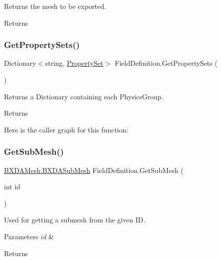 Returns the mesh to be exported. 

\begin{DoxyReturn}{Returns}

\end{DoxyReturn}
\mbox{\label{class_field_definition_a46ad3d304c6caad10fa8cef5ddf0fe1f}} 
\subsubsection{\texorpdfstring{Get\+Property\+Sets()}{GetPropertySets()}}
{\footnotesize\ttfamily Dictionary$<$string, \hyperlink{struct_property_set}{Property\+Set}$>$ Field\+Definition.\+Get\+Property\+Sets (\begin{DoxyParamCaption}{ }\end{DoxyParamCaption})}



Returns a Dictionary containing each Physics\+Group. 

\begin{DoxyReturn}{Returns}

\end{DoxyReturn}
Here is the caller graph for this function\+:
\mbox{\label{class_field_definition_a5d2494daeb5679568c157d8668ca3cd6}} 
\subsubsection{\texorpdfstring{Get\+Sub\+Mesh()}{GetSubMesh()}}
{\footnotesize\ttfamily \hyperlink{class_b_x_d_a_mesh_1_1_b_x_d_a_sub_mesh}{B\+X\+D\+A\+Mesh.\+B\+X\+D\+A\+Sub\+Mesh} Field\+Definition.\+Get\+Sub\+Mesh (\begin{DoxyParamCaption}\item[{int}]{id }\end{DoxyParamCaption})}



Used for getting a submesh from the given ID. 


\begin{DoxyParams}{Parameters}
{\em id} & \\
\hline
\end{DoxyParams}
\begin{DoxyReturn}{Returns}

\end{DoxyReturn}


